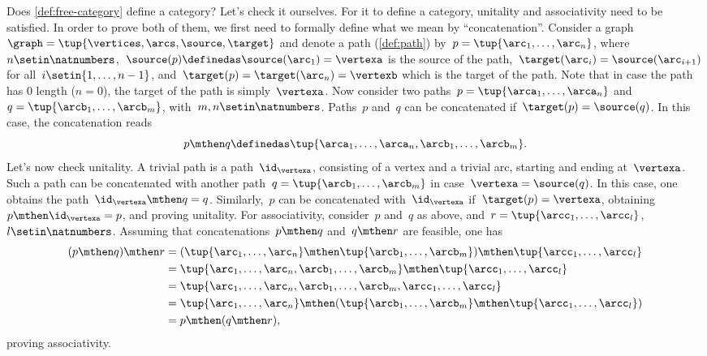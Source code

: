 Does \cref{def:free-category} define a category?
Let's check it ourselves.
For it to define a category, unitality and associativity need to be satisfied.
In order to prove both of them, we first need to formally define what we mean by ``concatenation''.
Consider a graph~$\graph=\tup{\vertices,\arcs,\source,\target}$ and denote a path (\cref{def:path}) by~$p=\tup{\arc_1,\ldots, \arc_n}$, where~$n\setin \natnumbers$,~$\source(p)\definedas\source(\arc_1)=\vertexa$ is the source of the path,~$\target(\arc_i)=\source(\arc_{i+1})$ for all~$i\setin \{1,\ldots,n-1\}$, and~$\target(p)=\target(\arc_n)=\vertexb$ which is the target of the path.
Note that in case the path has 0 length ($n=0$), the target of the path is simply~$\vertexa$.
Now consider two paths~$p=\tup{\arca_1,\ldots,\arca_n}$ and~$q=\tup{\arcb_1,\ldots,\arcb_m}$, with~$m,n\setin \natnumbers$.
Paths~$p$ and~$q$ can be concatenated if~$\target(p)=\source(q)$.
In this case, the concatenation reads
%
\begin{equation*}
    p\mthen q\definedas \tup{\arca_1,\ldots, \arca_n,\arcb_1,\ldots,\arcb_m}.
\end{equation*}
%
Let's now check unitality.
A trivial path is a path~$\id_\vertexa$, consisting of a vertex and a trivial arc, starting and ending at~$\vertexa$.
Such a path can be concatenated with another path~$q=\tup{\arcb_1,\ldots,\arcb_m}$ in case~$\vertexa=\source(q)$.
In this case, one obtains the path~$\id_\vertexa \mthen q=q$.
Similarly,~$p$ can be concatenated with~$\id_\vertexa$ if~$\target(p)=\vertexa$, obtaining~$p\mthen \id_\vertexa=p$, and proving unitality.
For associativity, consider~$p$ and~$q$ as above, and~$r=\tup{\arcc_1,\ldots,\arcc_l}$,~$l\setin \natnumbers$.
Assuming that concatenations~$p\mthen q$ and~$q\mthen r$ are feasible, one has
\begin{equation*}
    \begin{aligned}
        (p\mthen q)
        \mthen r & =(\tup{\arc_1,\ldots, \arc_n}\mthen \tup{\arcb_1,\ldots,\arcb_m})\mthen \tup{\arcc_1,\ldots,\arcc_l} \\
                 & =\tup{\arc_1,\ldots, \arc_n,\arcb_1,\ldots,\arcb_m}\mthen \tup{\arcc_1,\ldots,\arcc_l} \\
                 & = \tup{\arc_1,\ldots, \arc_n,\arcb_1,\ldots,\arcb_m, \arcc_1,\ldots,\arcc_l} \\
                 & =\tup{\arc_1,\ldots, \arc_n} \mthen (\tup{\arcb_1,\ldots,\arcb_m}\mthen \tup{\arcc_1,\ldots,\arcc_l}) \\
                 & =p\mthen (q\mthen r),
    \end{aligned}
\end{equation*}
proving associativity.

